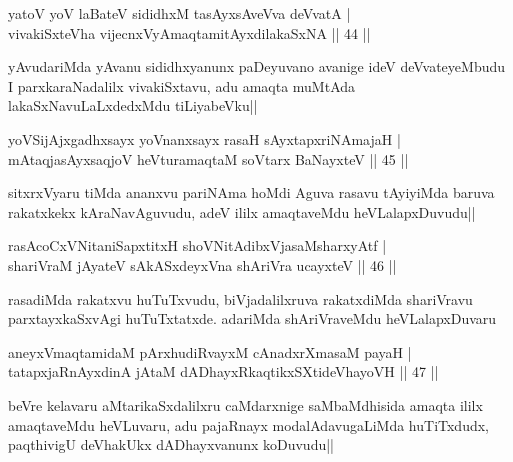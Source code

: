 
\begin{shl}
yatoV yoV laBateV sididhxM tasAyxsAveVva deVvatA |\\
vivakiSxteVha vijecnxVyA\s maqtamitAyxdilakaSxNA \hfill || 44 ||
\end{shl}

\begin{artha}
yAvudariMda yAvanu sididhxyanunx paDeyuvano avanige ideV deVvateyeMbudu I parxkaraNadalilx vivakiSxtavu, adu amaqta muMtAda lakaSxNavuLaLxdedxMdu tiLiyabeVku||
\end{artha}


\begin{shl}
yoVSijAjxgadhxsayx yoVnanxsayx rasaH sAyxtapxriNAmajaH |\\
mAtaqjasAyxsaqjoV heVturamaqtaM soV\s tarx BaNayxteV \hfill || 45 ||
\end{shl}

\begin{artha}
sitxrxVyaru tiMda ananxvu pariNAma hoMdi Aguva rasavu tAyiyiMda baruva rakatxkekx kAraNavAguvudu, adeV ililx amaqtaveMdu heVLalapxDuvudu||
\end{artha}

\begin{shl}
rasAcoCxVNitaniSapxtitxH shoVNitAdibxVjasaMsharxyAtf |\\
shariVraM jAyateV sAkASxdeyxVna shAriVra ucayxteV \hfill || 46 ||
\end{shl}

\begin{artha}
rasadiMda rakatxvu huTuTxvudu, biVjadalilxruva rakatxdiMda shariVravu parxtayxkaSxvAgi huTuTxtatxde. adariMda shAriVraveMdu heVLalapxDuvaru 
\end{artha}

\begin{shl}
aneyxV\s maqtamidaM pArxhudiRvayxM cAnadxrXmasaM payaH |\\
tatapxjaRnAyxdinA jAtaM dADhayxRkaqtikxSXtideVhayoVH \hfill || 47 ||
\end{shl}

\begin{artha}%
beVre kelavaru aMtarikaSxdalilxru caMdarxnige saMbaMdhisida amaqta ililx amaqtaveMdu heVLuvaru, adu pajaRnayx modalAdavugaLiMda huTiTxdudx, paqthivigU deVhakUkx dADhayxvanunx koDuvudu||
\end{artha}

